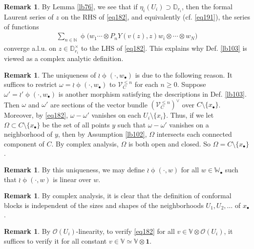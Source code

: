 \documentclass[12pt,a4paper,notitlepage]{article}
\theoremstyle{definition}
\newtheorem{rem}[df]{Remark}
\theoremstyle{plain}
\newcommand{\id}{\mathbf{1}}
\newcommand{\scr}{\mathscr}
\newcommand{\blt}{\bullet}
\newcommand{\Vbb}{\mathbb V}
\newcommand{\Wbb}{\mathbb W}
\newcommand{\Nbb}{\mathbb N}
\newcommand{\Dbb}{\mathbb D}
\numberwithin{equation}{section}
\begin{document}
\begin{rem}
By Lemma \ref{lb76}, we see that if $\eta_i(U_i)\supset\Dbb_{r_i}$, then the formal Laurent  series of $z$ on the RHS of \eqref{eq182}, and equivalently (cf. \eqref{eq191}), the series of functions
\begin{align*}
\sum_{n\in\Nbb}\upphi\big(w_1\cdots\otimes P_nY(v(z),z)w_i\otimes\cdots\otimes w_N\big)	
\end{align*}
converge a.l.u. on $z\in\Dbb_{r_i}^\times$ to the LHS of \eqref{eq182}. This explains why  Def. \ref{lb103} is viewed as a complex analytic definition.
\end{rem}


\begin{rem}
The uniqueness of $\wr\upphi(\cdot,w_\blt)$ is due to the following reason. It suffices to restrict $\omega=\wr\upphi(\cdot,w_\blt)$ to $\scr V^{\leq n}_C$ for each $n\geq 0$. Suppose $\omega'=\wr'\upphi(\cdot,w_\blt)$ is another morphism satisfying the descriptions in Def. \ref{lb103}.  Then $\omega$ and $\omega'$ are sections of the vector bundle $(\scr V_C^{\leq n})^\vee$ over $C\setminus\{x_\blt\}$. Moreover, by \eqref{eq182}, $\omega-\omega'$ vanishes on each $U_i\setminus\{x_i\}$.     Thus, if we let $\Omega\subset C\setminus\{x_\blt\}$ be the set of all points $y$ such that $\omega-\omega'$ vanishes on a neighborhood of $y$, then by Assumption \ref{lb102}, $\Omega$ intersects each connected component of $C$. By complex analysis, $\Omega$ is both open and closed. So $\Omega=C\setminus\{x_\blt\}$.
\end{rem}


\begin{rem}\label{lb191}
By this uniqueness, we may define $\wr\upphi(\cdot,w)$ for all $w\in\Wbb_\blt$ such that $\wr\upphi(\cdot,w)$ is linear over $w$.
\end{rem}

\begin{rem}
By complex analysis, it is clear that the definition of conformal blocks is independent of the sizes and shapes of the neighborhoods $U_1,U_2,\dots$ of $x_\blt$.
\end{rem}

\begin{rem}
By $\scr O(U_i)$-linearity, to verify \eqref{eq182} for all $v\in\Vbb\otimes\scr O(U_i)$, it suffices to verify it for all constant $v\in\Vbb\simeq \Vbb\otimes \id$.
\end{rem}




\subsection{}
\end{document}
